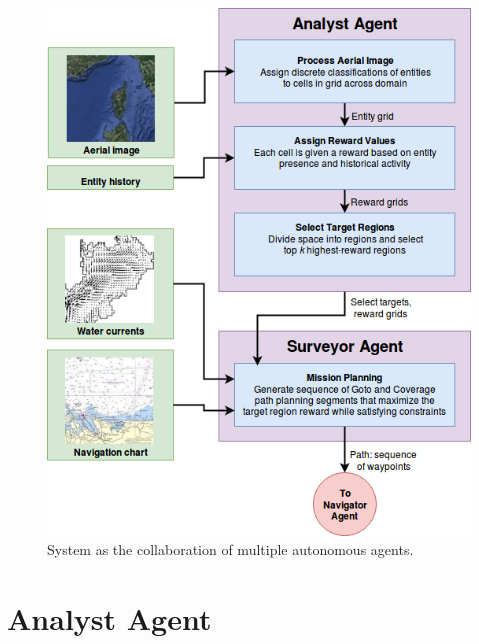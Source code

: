 \documentclass{tamuccthesis}
\begin{document}
\begin{figure}[H]
\includegraphics[width=\textwidth]{system_overview.png}
\caption[System as the collaboration of multiple autonomous agents.]{System as the collaboration of multiple autonomous agents.}
\label{fig:system_overview}
\end{figure}

\section{Analyst Agent}
\end{document}
